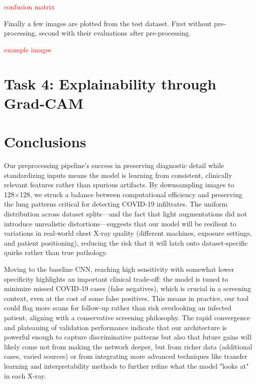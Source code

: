 \documentclass[conference]{IEEEtran}
\begin{document}
\centerline{\textcolor{red}{confusion matrix}}

Finally a few images are plotted from the test dataset. First without pre-processing, second with their evaluations after pre-processing.

\centerline{\textcolor{red}{example images}}	








\section{Task 4: Explainability through Grad-CAM} \label{sec:task_4}



\section{Conclusions}\label{sec:conclusions}

Our preprocessing pipeline’s success in preserving diagnostic detail while standardizing inputs means the model is learning from consistent, clinically relevant features rather than spurious artifacts. By downsampling images to 128×128, we struck a balance between computational efficiency and preserving the lung patterns critical for detecting COVID‑19 infiltrates. The uniform distribution across dataset splits—and the fact that light augmentations did not introduce unrealistic distortions—suggests that our model will be resilient to variations in real‑world chest X‑ray quality (different machines, exposure settings, and patient positioning), reducing the risk that it will latch onto dataset‐specific quirks rather than true pathology.

Moving to the baseline CNN, reaching high sensitivity with somewhat lower specificity highlights an important clinical trade‑off: the model is tuned to minimize missed COVID‑19 cases (false negatives), which is crucial in a screening context, even at the cost of some false positives. This means in practice, our tool could flag more scans for follow‑up rather than risk overlooking an infected patient, aligning with a conservative screening philosophy. The rapid convergence and plateauing of validation performance indicate that our architecture is powerful enough to capture discriminative patterns but also that future gains will likely come not from making the network deeper, but from richer data (additional cases, varied sources) or from integrating more advanced techniques like transfer learning and interpretability methods to further refine what the model "looks at" in each X‑ray.
\end{document}
